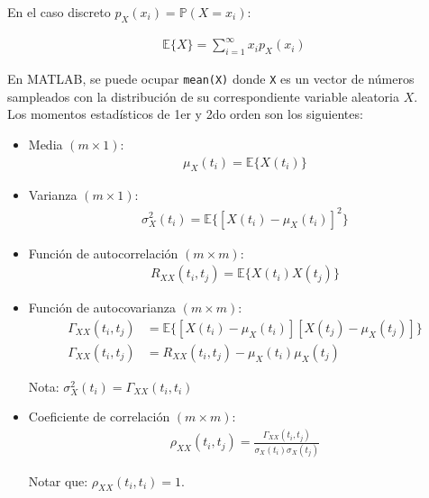 \begin{itemize}
    En el caso discreto $p_X(x_i) = \mathbb{P}(X=x_i)$:
    
    \begin{align*}
        \mathbb{E}\{X\} = \sum_{i=1}^{\infty} x_i p_X(x_i) 
    \end{align*}

    En MATLAB, se puede ocupar \texttt{mean(X)} donde \texttt{X} es un vector de números sampleados con la distribución de su correspondiente variable aleatoria $X$. \\ 
    
    Los momentos estadísticos de 1er y 2do orden son los siguientes:
    \begin{itemize}
        \item Media $(m \times 1)$: 
        \begin{align*}
            \mu_{X}(t_i)=\mathbb{E}\{X(t_i)\}
        \end{align*}
    
        \item Varianza $(m \times 1)$:
        \begin{align*}
            \sigma_{X}^2(t_i)=\mathbb{E}\{[X(t_i)-\mu_X(t_i)]^2\}
        \end{align*}
    
        \item Función de autocorrelación $(m \times m)$: 
        \begin{align*}
            R_{XX}(t_i,t_j)=\mathbb{E}\{X(t_i)X(t_j)\}
        \end{align*}
    
        \item Función de autocovarianza $(m \times m)$: 
        \begin{align*}
            \Gamma_{XX}(t_i,t_j)&=\mathbb{E}\{[X(t_i)-\mu_X(t_i)][X(t_j)-\mu_X(t_j)]\} \\
            \Gamma_{XX}(t_i,t_j)&=R_{XX}(t_i,t_j)-\mu_{X}(t_i) \mu_{X}(t_j)
        \end{align*}

        Nota: $\sigma_{X}^2(t_i) = \Gamma_{XX}(t_i,t_i)$
    
        \item Coeficiente de correlación $(m \times m)$: 
        \begin{align*}
            \rho_{XX}(t_i,t_j) = \frac{\Gamma_{XX}(t_i,t_j)}{\sigma_{X}(t_i)\sigma_{X}(t_j)}
        \end{align*}

        Notar que: $\rho_{XX}(t_i, t_i) = 1$.\\
        

\end{itemize}
\end{itemize}
